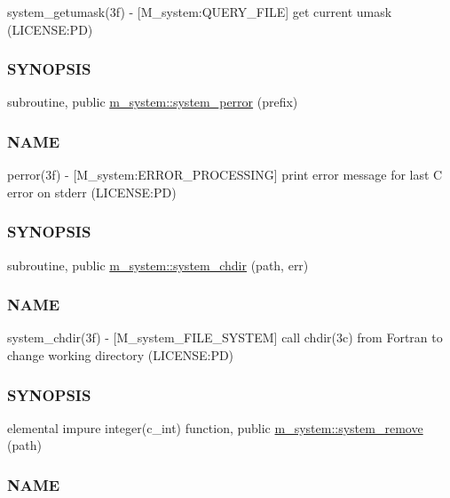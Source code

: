 \begin{DoxyCompactItemize}
\begin{DoxyCompactList}
system\+\_\+getumask(3f) -\/ \mbox{[}M\+\_\+system\+:Q\+U\+E\+R\+Y\+\_\+\+F\+I\+LE\mbox{]} get current umask (L\+I\+C\+E\+N\+SE\+:PD) \subsubsection*{S\+Y\+N\+O\+P\+S\+IS}\end{DoxyCompactList}\item 
subroutine, public \mbox{\hyperlink{namespacem__system_afae451a1fc5432274dc1f75a364051b4}{m\+\_\+system\+::system\+\_\+perror}} (prefix)
\begin{DoxyCompactList}\small\item\em \subsubsection*{N\+A\+ME}

perror(3f) -\/ \mbox{[}M\+\_\+system\+:E\+R\+R\+O\+R\+\_\+\+P\+R\+O\+C\+E\+S\+S\+I\+NG\mbox{]} print error message for last C error on stderr (L\+I\+C\+E\+N\+SE\+:PD) \subsubsection*{S\+Y\+N\+O\+P\+S\+IS}\end{DoxyCompactList}\item 
subroutine, public \mbox{\hyperlink{namespacem__system_a47746b670cb21bae0957c9bb2bccf209}{m\+\_\+system\+::system\+\_\+chdir}} (path, err)
\begin{DoxyCompactList}\small\item\em \subsubsection*{N\+A\+ME}

system\+\_\+chdir(3f) -\/ \mbox{[}M\+\_\+system\+\_\+\+F\+I\+L\+E\+\_\+\+S\+Y\+S\+T\+EM\mbox{]} call chdir(3c) from Fortran to change working directory (L\+I\+C\+E\+N\+SE\+:PD) \subsubsection*{S\+Y\+N\+O\+P\+S\+IS}\end{DoxyCompactList}\item 
elemental impure integer(c\+\_\+int) function, public \mbox{\hyperlink{namespacem__system_a7fa10b991ae066609b687423918cff52}{m\+\_\+system\+::system\+\_\+remove}} (path)
\begin{DoxyCompactList}\small\item\em \subsubsection*{N\+A\+ME}


\end{DoxyCompactList}
\end{DoxyCompactItemize}

